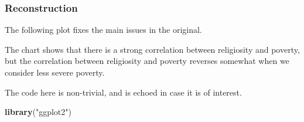 \documentclass[
]{article}
\newenvironment{Shaded}{\begin{snugshade}}{\end{snugshade}}
\newcommand{\FunctionTok}[1]{\textcolor[rgb]{0.13,0.29,0.53}{\textbf{#1}}}
\newcommand{\NormalTok}[1]{#1}
\newcommand{\StringTok}[1]{\textcolor[rgb]{0.31,0.60,0.02}{#1}}
\begin{document}
\subsubsection{Reconstruction}\label{reconstruction}

The following plot fixes the main issues in the original.

The chart shows that there is a strong correlation between religiosity
and poverty, but the correlation between religiosity and poverty
reverses somewhat when we consider less severe poverty.

The code here is non-trivial, and is echoed in case it is of interest.

\begin{Shaded}
\begin{Highlighting}[]
\FunctionTok{library}\NormalTok{(}\StringTok{"ggplot2"}\NormalTok{)}


\end{Highlighting}
\end{Shaded}
\end{document}
